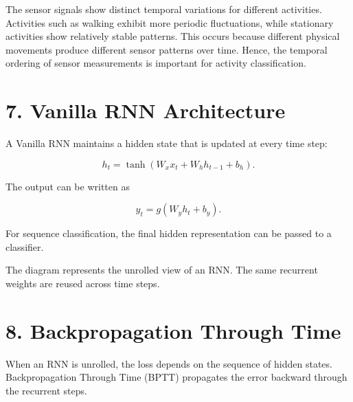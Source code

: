 \documentclass[10pt]{article}
\begin{document}
The sensor signals show distinct temporal variations for different activities. Activities such as walking exhibit more periodic fluctuations, while stationary activities show relatively stable patterns. This occurs because different physical movements produce different sensor patterns over time. Hence, the temporal ordering of sensor measurements is important for activity classification.

\section*{7. Vanilla RNN Architecture}

A Vanilla RNN maintains a hidden state that is updated at every time step:

\[
h_t=\tanh(W_xx_t+W_hh_{t-1}+b_h).
\]

The output can be written as

\[
y_t=g(W_yh_t+b_y).
\]

For sequence classification, the final hidden representation can be passed
to a classifier.

\begin{center}
\end{center}

The diagram represents the unrolled view of an RNN. The same recurrent weights
are reused across time steps.

\section*{8. Backpropagation Through Time}

When an RNN is unrolled, the loss depends on the sequence of hidden states.
Backpropagation Through Time (BPTT) propagates the error backward through
the recurrent steps.
\end{document}
